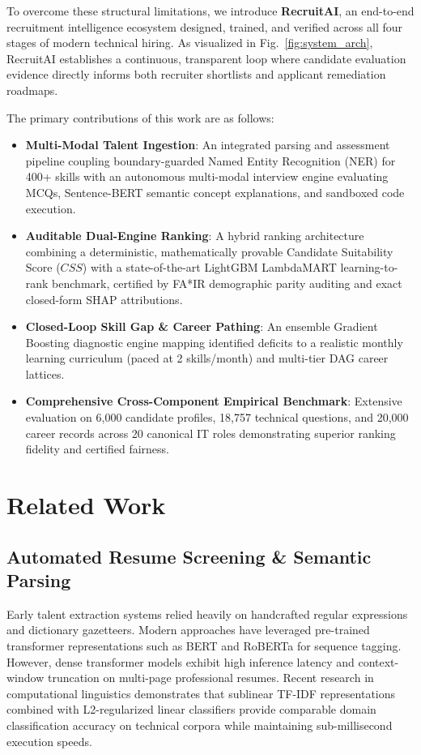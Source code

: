 \documentclass[conference]{IEEEtran}
\begin{document}
To overcome these structural limitations, we introduce \textbf{RecruitAI}, an end-to-end recruitment intelligence ecosystem designed, trained, and verified across all four stages of modern technical hiring. As visualized in Fig.~\ref{fig:system_arch}, RecruitAI establishes a continuous, transparent loop where candidate evaluation evidence directly informs both recruiter shortlists and applicant remediation roadmaps.

The primary contributions of this work are as follows:
\begin{itemize}
    \item \textbf{Multi-Modal Talent Ingestion}: An integrated parsing and assessment pipeline coupling boundary-guarded Named Entity Recognition (NER) for 400+ skills with an autonomous multi-modal interview engine evaluating MCQs, Sentence-BERT semantic concept explanations, and sandboxed code execution.
    \item \textbf{Auditable Dual-Engine Ranking}: A hybrid ranking architecture combining a deterministic, mathematically provable Candidate Suitability Score ($CSS$) with a state-of-the-art LightGBM LambdaMART learning-to-rank benchmark, certified by FA*IR demographic parity auditing and exact closed-form SHAP attributions.
    \item \textbf{Closed-Loop Skill Gap \& Career Pathing}: An ensemble Gradient Boosting diagnostic engine mapping identified deficits to a realistic monthly learning curriculum (paced at 2 skills/month) and multi-tier DAG career lattices.
    \item \textbf{Comprehensive Cross-Component Empirical Benchmark}: Extensive evaluation on 6,000 candidate profiles, 18,757 technical questions, and 20,000 career records across 20 canonical IT roles demonstrating superior ranking fidelity and certified fairness.
\end{itemize}

\section{Related Work}

\subsection{Automated Resume Screening \& Semantic Parsing}
Early talent extraction systems relied heavily on handcrafted regular expressions and dictionary gazetteers. Modern approaches have leveraged pre-trained transformer representations such as BERT and RoBERTa for sequence tagging. However, dense transformer models exhibit high inference latency and context-window truncation on multi-page professional resumes. Recent research in computational linguistics demonstrates that sublinear TF-IDF representations combined with L2-regularized linear classifiers provide comparable domain classification accuracy on technical corpora while maintaining sub-millisecond execution speeds.
\end{document}
